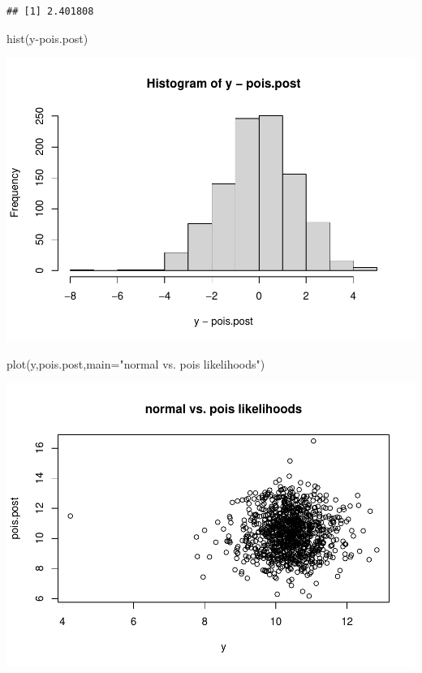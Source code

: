 \documentclass[
]{book}
\newenvironment{Shaded}{\begin{snugshade}}{\end{snugshade}}
\newcommand{\AttributeTok}[1]{\textcolor[rgb]{0.77,0.63,0.00}{#1}}
\newcommand{\FunctionTok}[1]{\textcolor[rgb]{0.00,0.00,0.00}{#1}}
\newcommand{\NormalTok}[1]{#1}
\newcommand{\SpecialCharTok}[1]{\textcolor[rgb]{0.00,0.00,0.00}{#1}}
\newcommand{\StringTok}[1]{\textcolor[rgb]{0.31,0.60,0.02}{#1}}
\theoremstyle{definition}
\theoremstyle{definition}
\theoremstyle{definition}
\theoremstyle{definition}
\theoremstyle{remark}
\begin{document}
\begin{verbatim}
## [1] 2.401808
\end{verbatim}

\begin{Shaded}
\begin{Highlighting}[]
 \FunctionTok{hist}\NormalTok{(y}\SpecialCharTok{{-}}\NormalTok{pois.post)}
\end{Highlighting}
\end{Shaded}

\includegraphics{_main_files/figure-latex/unnamed-chunk-41-1.pdf}

\begin{Shaded}
\begin{Highlighting}[]
 \FunctionTok{plot}\NormalTok{(y,pois.post,}\AttributeTok{main=}\StringTok{"normal vs. pois likelihoods"}\NormalTok{)}
\end{Highlighting}
\end{Shaded}

\includegraphics{_main_files/figure-latex/unnamed-chunk-41-2.pdf}
\end{document}

